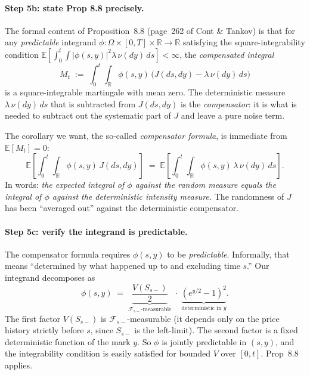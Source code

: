 \documentclass[11pt]{article}
\theoremstyle{definition}
\theoremstyle{remark}
\newcommand{\E}{\mathbb{E}}
\newcommand{\R}{\mathbb{R}}
\newcommand{\1}{\mathbf{1}}
\begin{document}
\paragraph{Step 5b: state Prop 8.8 precisely.}
The formal content of Proposition~8.8 (page~262 of Cont \& Tankov) is that for any \emph{predictable} integrand $\phi: \Omega \times [0,T] \times \R \to \R$ satisfying the square-integrability condition $\E[\int_0^t\!\int |\phi(s,y)|^2 \lambda\,\nu(dy)\,ds] < \infty$, the \emph{compensated integral}
\[
M_t \;:=\; \int_0^t\!\int_\R \phi(s, y)\,\big(J(ds, dy) - \lambda\,\nu(dy)\,ds\big)
\]
is a square-integrable martingale with mean zero. The deterministic measure $\lambda\,\nu(dy)\,ds$ that is subtracted from $J(ds, dy)$ is the \emph{compensator}: it is what is needed to subtract out the systematic part of $J$ and leave a pure noise term.

The corollary we want, the so-called \emph{compensator formula}, is immediate from $\E[M_t] = 0$:
\begin{equation}\label{eq:compensator}
\E\!\left[\int_0^t\!\int_\R \phi(s, y)\,J(ds, dy)\right] \;=\; \E\!\left[\int_0^t\!\int_\R \phi(s, y)\,\lambda\,\nu(dy)\,ds\right].
\end{equation}
In words: \emph{the expected integral of $\phi$ against the random measure equals the integral of $\phi$ against the deterministic intensity measure.} The randomness of $J$ has been ``averaged out'' against the deterministic compensator.

\paragraph{Step 5c: verify the integrand is predictable.}
The compensator formula requires $\phi(s, y)$ to be \emph{predictable}. Informally, that means ``determined by what happened up to and excluding time $s$.'' Our integrand decomposes as
\[
\phi(s, y) \;=\; \underbrace{\frac{V(S_{s-})}{2}}_{\mathcal{F}_{s-}\text{-measurable}} \;\cdot\; \underbrace{(e^{y/2} - 1)^2}_{\text{deterministic in }y}.
\]
The first factor $V(S_{s-})$ is $\mathcal{F}_{s-}$-measurable (it depends only on the price history strictly before $s$, since $S_{s-}$ is the left-limit). The second factor is a fixed deterministic function of the mark $y$. So $\phi$ is jointly predictable in $(s, y)$, and the integrability condition is easily satisfied for bounded $V$ over $[0, t]$. Prop~8.8 applies.
\end{document}
